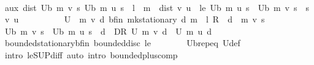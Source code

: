 \begin{isabellebody}
%
\isadelimproof
%
\endisadelimproof
%
\isatagproof
{}\isamarkupfalse%
\ {\isacharminus}{\kern0pt}\isanewline
\ \ \isamarkupfalse%
\ aux{\isacharcolon}{\kern0pt}\ {\isachardoublequoteopen}dist\ {\isacharparenleft}{\kern0pt}U\isactrlsub b\ m\ v\ s{\isacharparenright}{\kern0pt}\ {\isacharparenleft}{\kern0pt}U\isactrlsub b\ m\ u\ s{\isacharparenright}{\kern0pt}\ {\isasymle}\ l\ {\isacharcircum}{\kern0pt}\ m\ {\isacharasterisk}{\kern0pt}\ dist\ v\ u{\isachardoublequoteclose}\ \ le{\isacharcolon}{\kern0pt}\ {\isachardoublequoteopen}U\isactrlsub b\ m\ u\ s\ {\isasymle}\ U\isactrlsub b\ m\ v\ s{\isachardoublequoteclose}\ \ s\ v\ u\isanewline
\ \ \isamarkupfalse%
\ {\isacharminus}{\kern0pt}\isanewline
\ \ \ \ \isamarkupfalse%
\ {\isacharquery}{\kern0pt}U\ {\isacharequal}{\kern0pt}\ {\isachardoublequoteopen}{\isasymlambda}m\ v\ d{\isachardot}{\kern0pt}\ {\isacharparenleft}{\kern0pt}{\isasymnu}\isactrlsub b{\isacharunderscore}{\kern0pt}fin\ {\isacharparenleft}{\kern0pt}mk{\isacharunderscore}{\kern0pt}stationary\ d{\isacharparenright}{\kern0pt}\ m\ {\isacharplus}{\kern0pt}\ {\isacharparenleft}{\kern0pt}{\isacharparenleft}{\kern0pt}l\ {\isacharasterisk}{\kern0pt}\isactrlsub R\ {\isasymP}\ d{\isacharparenright}{\kern0pt}\ {\isacharcircum}{\kern0pt}{\isacharcircum}{\kern0pt}\ m{\isacharparenright}{\kern0pt}\ v{\isacharparenright}{\kern0pt}\ s{\isachardoublequoteclose}\isanewline
\ \ \ \ \isamarkupfalse%
\ {\isachardoublequoteopen}U\isactrlsub b\ m\ v\ s\ {\isacharminus}{\kern0pt}\ U\isactrlsub b\ m\ u\ s\ {\isasymle}\ {\isacharparenleft}{\kern0pt}{\isasymSqunion}d\ {\isasymin}\ D\isactrlsub R{\isachardot}{\kern0pt}\ {\isacharquery}{\kern0pt}U\ m\ v\ d\ {\isacharminus}{\kern0pt}\ {\isacharquery}{\kern0pt}U\ m\ u\ d{\isacharparenright}{\kern0pt}{\isachardoublequoteclose}\isanewline
\ \ \ \ \ \ \isamarkupfalse%
\ bounded{\isacharunderscore}{\kern0pt}stationary{\isacharunderscore}{\kern0pt}{\isasymnu}\isactrlsub b{\isacharunderscore}{\kern0pt}fin\ bounded{\isacharunderscore}{\kern0pt}disc{\isacharunderscore}{\kern0pt}{\isasymP}\ le\isanewline
\ \ \ \ \ \ \isamarkupfalse%
\ U\isactrlsub b{\isachardot}{\kern0pt}rep{\isacharunderscore}{\kern0pt}eq\ U{\isacharunderscore}{\kern0pt}def\isanewline
\ \ \ \ \ \ \isamarkupfalse%
\ {\isacharparenleft}{\kern0pt}intro\ le{\isacharunderscore}{\kern0pt}SUP{\isacharunderscore}{\kern0pt}diff{\isacharprime}{\kern0pt}{\isacharparenright}{\kern0pt}\ {\isacharparenleft}{\kern0pt}auto\ intro{\isacharcolon}{\kern0pt}\ bounded{\isacharunderscore}{\kern0pt}plus{\isacharunderscore}{\kern0pt}comp{\isacharparenright}{\kern0pt}\isanewline

\end{isabellebody}
